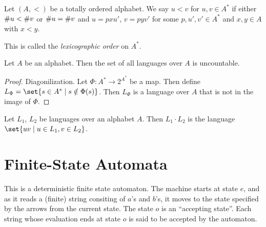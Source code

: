 \begin{definition} \label{def:languages:lexicographic}
    Let $(A, <)$ be a totally ordered alphabet.
    We say $u < v$ for $u, v \in A^*$ if either $\# u < \# v$ or
    $\# u = \# v$ and $u = pxu'$, $v = pyv'$ for some $p, u', v' \in A^*$
    and $x, y \in A$ with $x < y$.

    This is called the \emph{lexicographic order} on $A^*$.
\end{definition}

\begin{proposition}
    Let $A$ be an alphabet.
    Then the set of all languages over $A$ is uncountable.
\end{proposition}
\begin{proof}
    Diagonilization.
    Let $\Phi\colon A^* \to 2^{A^*}$ be a map.
    Then define $L_\Phi = \set{s \in A^* \mid s \notin \Phi(s)}$.
    Then $L_\Phi$ is a language over $A$ that is not in the image of $\Phi$.
\end{proof}

\begin{definition}[Concatenations] \label{def:languages:concatenations}
    Let $L_1$, $L_2$ be languages over an alphabet $A$.
    Then $L_1 \cdot L_2$ is the language $\set{uv \mid u \in L_1, v \in L_2}$.
\end{definition}

\chapter{Finite-State Automata} \label{chp:fa}
\begin{center}
\end{center}
This is a deterministic finite state automaton.
The machine starts at state $e$,
and as it reads a (finite) string consiting of $a$'s and $b$'s,
it moves to the state specified by the arrows from the current state.
The state $o$ is an ``accepting state''.
Each string whose evaluation ends at state $o$ is said to be accepted by the
automaton.

